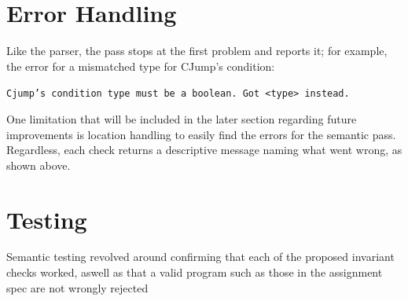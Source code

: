 \documentclass[11pt,a4paper,oneside]{report}
\begin{document}
	\newpage
	\section{Error Handling}
	Like the parser, the pass stops at the first problem and reports it; for example, the error for a mismatched type for CJump's condition: 
	
	\begin{center}
		\texttt{Cjump's condition type must be a boolean. Got <type> instead.}
	\end{center}
	
	\begin{riskbox}
		One limitation that will be included in the later section regarding future improvements is location handling to easily find the errors for the semantic pass. Regardless, each check returns a descriptive message naming what went wrong, as shown above. 
	\end{riskbox}
	
		
	\section{Testing}
	
	\begin{testbox}
		Semantic testing revolved around confirming that each of the proposed invariant checks worked, aswell as that a valid program such as those in the assignment spec are not wrongly rejected 
		
	\end{testbox}
	
\end{document}
